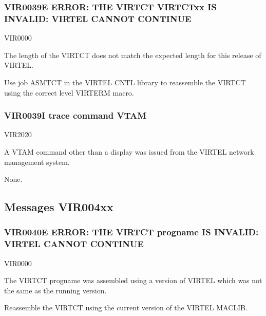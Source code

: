 \documentclass[letterpaper,10pt,english]{sphinxmanual}
\begin{document}
\subsubsection{VIR0039E ERROR: THE VIRTCT VIRTCTxx IS INVALID: VIRTEL CANNOT CONTINUE}
\label{\detokenize{messages:vir0039e-error-the-virtct-virtctxx-is-invalid-virtel-cannot-continue}}\begin{description}
\sphinxAtStartPar
VIR0000

\sphinxAtStartPar
The length of the VIRTCT does not match the expected length for this release of VIRTEL.

\sphinxAtStartPar
Use job ASMTCT in the VIRTEL CNTL library to reassemble the VIRTCT using the correct level VIRTERM macro.

\end{description}


\subsubsection{VIR0039I trace command VTAM}
\label{\detokenize{messages:vir0039i-trace-command-vtam}}\begin{description}
\sphinxAtStartPar
VIR2020

\sphinxAtStartPar
A VTAM command other than a display was issued from the VIRTEL network management system.

\sphinxAtStartPar
None.

\end{description}


\subsection{Messages VIR004xx}
\label{\detokenize{messages:messages-vir004xx}}

\subsubsection{VIR0040E ERROR: THE VIRTCT progname IS INVALID: VIRTEL CANNOT CONTINUE}
\label{\detokenize{messages:vir0040e-error-the-virtct-progname-is-invalid-virtel-cannot-continue}}\begin{description}
\sphinxAtStartPar
VIR0000

\sphinxAtStartPar
The VIRTCT progname was assembled using a version of VIRTEL which was not the same as the running version.

\sphinxAtStartPar
Re\sphinxhyphen{}assemble the VIRTCT using the current version of the VIRTEL MACLIB.

\end{description}
\end{document}
